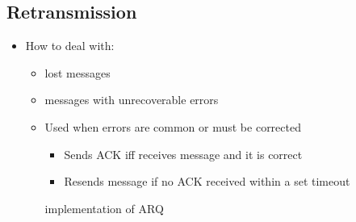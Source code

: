 \subsection{Retransmission} 
\begin{itemize}
    \item How to deal with:
        \begin{itemize}
            \item lost messages
            \item messages with unrecoverable errors
        \end{itemize}
        \begin{itemize}
            \item Used when errors are common or must be corrected
                \begin{itemize}
                    \item Sends ACK iff receives message and it is correct
                \end{itemize}
                \begin{itemize}
                    \item Resends message if no ACK received within a set timeout
                \end{itemize}
             implementation of ARQ
        \end{itemize}
\end{itemize}

